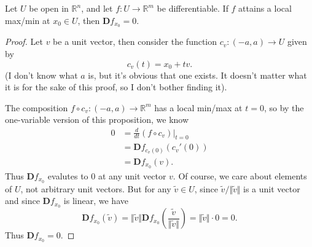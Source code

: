 \documentclass[10pt]{report}
\begin{document}
\begin{prop}
	Let $U$ be open in $\mathbb{R}^n$, and let $f: U \to \mathbb{R}^m$ be differentiable. If $f$ attains a local max/min at $x_0 \in U$, then $\mathbf{D}f_{x_0}=0$.
\end{prop}
\begin{proof}
	Let $v$ be a unit vector, then consider the function $c_v: (-a, a) \to U$ given by
	\[
		c_v(t) = x_0 + tv.
	\] (I don't know what $a$ is, but it's obvious that one exists. It doesn't matter what it is for the sake of this proof, so I don't bother finding it).

	The composition $f \circ c_v: (-a, a) \to \mathbb{R}^m$ has a local min/max at $t=0$, so by the one-variable version of this proposition, we know
	\begin{align*}
		0 &= \frac{d }{d t} (f \circ c_v) \Big|_{t=0} \\
		  &= \mathbf{D}f_{c_v(0)} (c_v'(0)) \\
		  &= \mathbf{D}f_{x_0} (v).
	\end{align*}
	Thus $\mathbf{D}f_{x_0}$ evalutes to 0 at any unit vector $v$. Of course, we care about elements of $U$, not arbitrary unit vectors. But for any $\tilde{v} \in U$, since $\tilde{v}/ \Vert{\tilde{v}}\Vert$ is a unit vector and since $\mathbf{D}f_{x_0}$ is linear, we have
	\[
		\mathbf{D}f_{x_0}(\tilde{v}) = \Vert{\tilde{v}}\Vert \mathbf{D}f_{x_0}\left( \frac{\tilde{v}}{\Vert{\tilde{v}}\Vert}  \right) = \Vert{\tilde{v}}\Vert \cdot 0 = 0.
	\] Thus $\mathbf{D}f_{x_0}=0.$
\end{proof}
\end{document}

